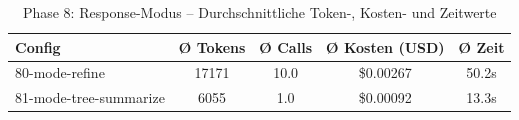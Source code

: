 \begin{table}[H]
\centering
\small
\begin{tabular}{lcccc}
\toprule
Config & Ø Tokens & Ø Calls & Ø Kosten (USD) & Ø Zeit \\
\midrule
80-mode-refine & 17171 & 10.0 & \$0.00267 & 50.2s \\
81-mode-tree-summarize & 6055 & 1.0 & \$0.00092 & 13.3s \\
\bottomrule
\end{tabular}
\caption{Phase 8: Response-Modus -- Durchschnittliche Token-, Kosten- und Zeitwerte}
\label{tab:phase8_cost}
\end{table}